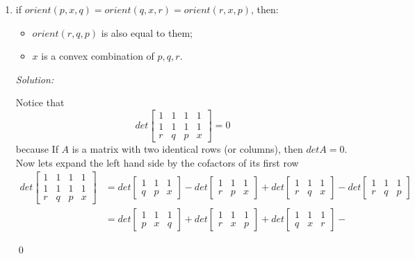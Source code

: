 \documentclass[a4paper, 8pt, oneside]{article}
\newenvironment{sol}
    {\emph{Solution:}
    }
    {
    \qed
    }
\begin{document}
\begin{enumerate}
\begin{enumerate}
\item \label{itm:interiority} if $orient(p,x,q) =orient(q,x,r) = orient(r,x,p)$, then:
\begin{itemize}
\item $orient(r,q,p)$ is also equal to them;
\item $x$ is a convex combination of $p,q,r$.
\end{itemize}
\begin{sol}
Notice that
\begin{equation*} det
\begin{bmatrix}
    1 &1 & 1 & 1\\
    1 &1 & 1 & 1\\
    r &q & p & x
\end{bmatrix} = 0
\end{equation*}
because If $A$ is a matrix with two identical rows (or columns), then $det A = 0$.
Now lets expand the left hand side by the cofactors of its first row
\begin{align*}
det
\begin{bmatrix}
    1 &1 & 1 & 1\\
    1 &1 & 1 & 1\\
    r &q & p & x
\end{bmatrix} &=
det
\begin{bmatrix}
    1 & 1 & 1\\
    q& p & x
\end{bmatrix} -
det
\begin{bmatrix}
    1 & 1 & 1\\
    r & p& x
\end{bmatrix} +
det
\begin{bmatrix}
    1 & 1 & 1\\
    r & q & x
\end{bmatrix} -
det
\begin{bmatrix}
    1 & 1 & 1\\
    r & q & p
\end{bmatrix} \\&=
det
\begin{bmatrix}
    1 & 1 & 1\\
    p& x & q
\end{bmatrix} +
det
\begin{bmatrix}
    1 & 1 & 1\\
    r & x& p
\end{bmatrix} +
det
\begin{bmatrix}
    1 & 1 & 1\\
    q & x & r
\end{bmatrix} -

\end{align*}
\end{sol}
\end{enumerate}
\end{enumerate}
\end{document}
